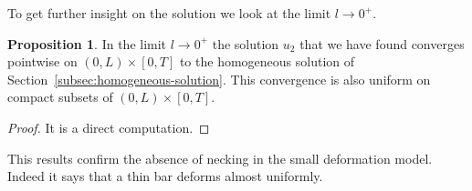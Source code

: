 \documentclass[a4paper,10pt,twoside]{amsbook}
\numberwithin{section}{chapter}
\numberwithin{equation}{chapter}
\theoremstyle{definition}
\newtheorem{prop}{Proposition}[chapter]
\begin{document}
To get further insight on the solution we look at the limit $l\to0^+$.
\begin{prop}
In the limit $l\to0^+$ the solution $u_2$ that we have found converges pointwise on $(0,L)\times[0,T]$ to the homogeneous solution of Section~\ref{subsec:homogeneous-solution}. This convergence is also uniform on compact subsets of $(0,L)\times[0,T]$.
\end{prop}
\begin{proof}
It is a direct computation.
\end{proof}
This results confirm the absence of necking in the small deformation model. Indeed it says that a thin bar deforms almost uniformly.

%
\end{document}
